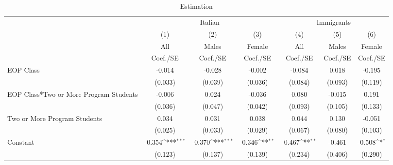\begin{table}[htbp]\centering
\def\sym#1{\ifmmode^{#1}\else\(^{#1}\)\fi}
\caption{Estimation \label{peer\_stdinvalsiIII}}
\begin{tabular}{l*{6}{c}}
\toprule
                    &\multicolumn{3}{c}{Italian}                                      &\multicolumn{3}{c}{Immigrants}                                   \\\cmidrule(lr){2-4}\cmidrule(lr){5-7}
                    &\multicolumn{1}{c}{(1)}&\multicolumn{1}{c}{(2)}&\multicolumn{1}{c}{(3)}&\multicolumn{1}{c}{(4)}&\multicolumn{1}{c}{(5)}&\multicolumn{1}{c}{(6)}\\
                    &\multicolumn{1}{c}{All}&\multicolumn{1}{c}{Males}&\multicolumn{1}{c}{Female}&\multicolumn{1}{c}{All}&\multicolumn{1}{c}{Males}&\multicolumn{1}{c}{Female}\\
                    &    Coef./SE         &    Coef./SE         &    Coef./SE         &    Coef./SE         &    Coef./SE         &    Coef./SE         \\
\midrule
EOP Class           &      -0.014         &      -0.028         &      -0.002         &      -0.084         &       0.018         &      -0.195         \\
                    &     (0.033)         &     (0.039)         &     (0.036)         &     (0.084)         &     (0.093)         &     (0.119)         \\
EOP Class*Two or More Program Students&      -0.006         &       0.024         &      -0.036         &       0.080         &      -0.015         &       0.191         \\
                    &     (0.036)         &     (0.047)         &     (0.042)         &     (0.093)         &     (0.105)         &     (0.133)         \\
Two or More Program Students&       0.034         &       0.031         &       0.038         &       0.044         &       0.130         &      -0.051         \\
                    &     (0.025)         &     (0.033)         &     (0.029)         &     (0.067)         &     (0.080)         &     (0.103)         \\
Constant            &      -0.354\sym{***}&      -0.370\sym{***}&      -0.346\sym{**} &      -0.467\sym{**} &      -0.461         &      -0.508\sym{*}  \\
                    &     (0.123)         &     (0.137)         &     (0.139)         &     (0.234)         &     (0.406)         &     (0.290)         \\

\end{tabular}
\end{table}
